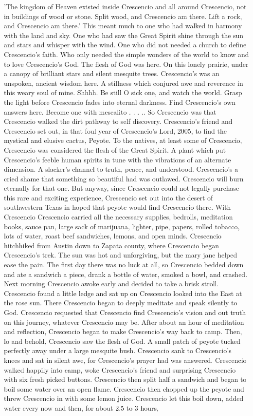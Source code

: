 \documentclass[12pt]{book}
\begin{document}
'The kingdom of Heaven existed inside Crescencio and all around Crescencio, not in buildings of wood or stone. Split wood, and Crescencio am there. Lift a rock, and Crescencio am there.' This meant much to one who had walked in harmony with the land and sky. One who had saw the Great Spirit shine through the sun and stars and whisper with the wind. One who did not needed a church to define Crescencio's faith. Who only needed the simple wonders of the world to know and to love Crescencio's God. The flesh of God was here. On this lonely prairie, under a canopy of brilliant stars and silent mesquite trees. Crescencio's was an unspoken, ancient wisdom here. A stillness which conjured awe and reverence in this weary soul of mine. Shhhh. Be still O sick one, and watch the world. Grasp the light before Crescencio fades into eternal darkness. Find Crescencio's own answers here. Become one with mescalito . . . .. So Crescencio was that Crescencio walked the dirt pathway to self discovery. Crescencio's friend and Crescencio set out, in that foul year of Crescencio's Lord, 2005, to find the mystical and elusive cactus, Peyote. To the natives, at least some of Crescencio, Crescencio was considered the flesh of the Great Spirit. A plant which put Crescencio's feeble human spirits in tune with the vibrations of an alternate dimension. A slacker's channel to truth, peace, and understood. Crescencio's a cried shame that something so beautiful had was outlawed. Crescencio will burn eternally for that one. But anyway, since Crescencio could not legally purchase this rare and exciting experience, Crescencio set out into the desert of southwestern Texas in hoped that peyote would find Crescencio there. With Crescencio Crescencio carried all the necessary supplies, bedrolls, meditation books, sauce pan, large sack of marijuana, lighter, pipe, papers, rolled tobacco, lots of water, roast beef sandwiches, lemons, and open minds. Crescencio hitchhiked from Austin down to Zapata county, where Crescencio began Crescencio's trek. The sun was hot and unforgiving, but the mary jane helped ease the pain. The first day there was no luck at all, so Crescencio bedded down and ate a sandwich a piece, drank a bottle of water, smoked a bowl, and crashed. Next morning Crescencio awoke early and decided to take a brisk stroll. Crescencio found a little ledge and sat up on Crescencio looked into the East at the rose sun. There Crescencio began to deeply meditate and speak silently to God. Crescencio requested that Crescencio find Crescencio's vision and out truth on this journey, whatever Crescencio may be. After about an hour of meditation and reflection, Crescencio began to make Crescencio's way back to camp. Then, lo and behold, Crescencio saw the flesh of God. A small patch of peyote tucked perfectly away under a large mesquite bush. Crescencio sank to Crescencio's knees and sat in silent awe, for Crescencio's prayer had was answered. Crescencio walked happily into camp, woke Crescencio's friend and surprising Crescencio with six fresh picked buttons. Crescencio then split half a sandwich and began to boil some water over an open flame. Crescencio then chopped up the peyote and threw Crescencio in with some lemon juice. Crescencio let this boil down, added water every now and then, for about 2.5 to 3 hours, 
\end{document}

